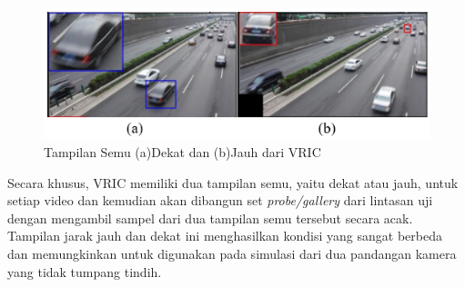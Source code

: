 \begin{figure}[ht]
  \centering
  \includegraphics[scale=1]{gambar/Tampilan Dekat dan Jauh.png}
  \caption{Tampilan Semu (a)Dekat dan (b)Jauh dari VRIC}
  \label{fig:tampilansemuvric}
\end{figure}

Secara khusus, VRIC memiliki dua tampilan semu, yaitu dekat atau jauh, untuk setiap video dan kemudian akan dibangun set \emph{probe/gallery} dari lintasan uji dengan mengambil sampel 
dari dua tampilan semu tersebut secara acak. Tampilan jarak jauh dan dekat ini menghasilkan kondisi yang sangat berbeda dan memungkinkan untuk digunakan pada simulasi dari dua pandangan 
kamera yang tidak tumpang tindih.\parencite{Kanaci2018}










